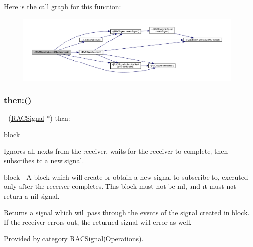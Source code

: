Here is the call graph for this function\+:\nopagebreak
\begin{figure}[H]
\begin{center}
\leavevmode
\includegraphics[width=350pt]{interface_r_a_c_signal_aa8536c9726338e10176997936be011ed_cgraph}
\end{center}
\end{figure}
\mbox{\label{interface_r_a_c_signal_aeed35de5a36e70f87721a0ad6ffabecd}} 
\subsubsection{\texorpdfstring{then\+:()}{then:()}\hspace{0.1cm}{\footnotesize\ttfamily [1/3]}}
{\footnotesize\ttfamily -\/ (\mbox{\hyperlink{interface_r_a_c_signal}{R\+A\+C\+Signal}} $\ast$) then\+: \begin{DoxyParamCaption}\item[{(\mbox{\hyperlink{interface_r_a_c_signal}{R\+A\+C\+Signal}} $\ast$($^\wedge$)(void))}]{block }\end{DoxyParamCaption}}

Ignores all {\ttfamily next}s from the receiver, waits for the receiver to complete, then subscribes to a new signal.

block -\/ A block which will create or obtain a new signal to subscribe to, executed only after the receiver completes. This block must not be nil, and it must not return a nil signal.

Returns a signal which will pass through the events of the signal created in {\ttfamily block}. If the receiver errors out, the returned signal will error as well. 

Provided by category \mbox{\hyperlink{category_r_a_c_signal_07_operations_08_aeed35de5a36e70f87721a0ad6ffabecd}{R\+A\+C\+Signal(\+Operations)}}.

